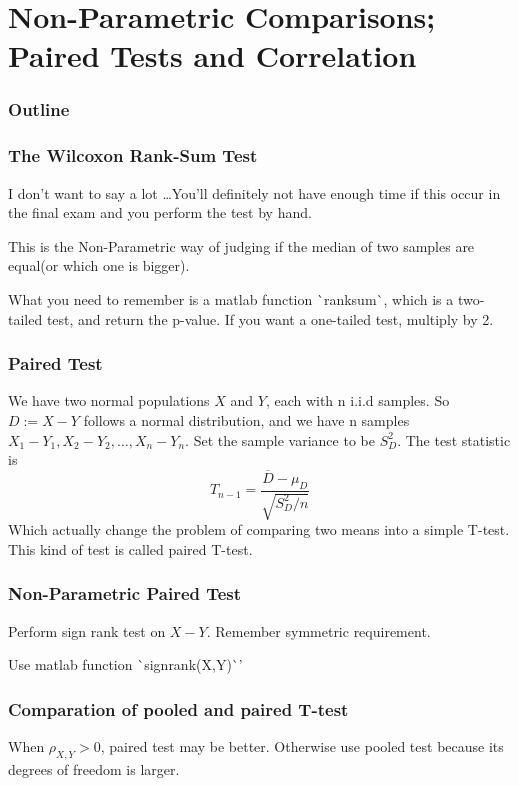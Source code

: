 \documentclass{beamer}
\begin{document}
\section{Non-Parametric Comparisons; Paired Tests and Correlation}
\begin{frame}
    \frametitle{Outline}
    \tableofcontents[currentsection]
\end{frame}

\begin{frame}
    \frametitle{The Wilcoxon Rank-Sum Test}

    I don't want to say a lot \dots You'll definitely not have enough time if this occur in the final exam and you perform the test by hand. \par
    This is the Non-Parametric way of judging if the median of two samples are equal(or which one is bigger). \par
    What you need to remember is a matlab function \`{}ranksum\`{}, which is a two-tailed test, and return the p-value. If you want a one-tailed test, multiply by 2.

\end{frame}

\begin{frame}
    \frametitle{Paired Test}

    We have two normal populations $X$ and $Y$, each with n i.i.d samples. So $D:=X-Y$ follows a normal distribution, and we have n samples $X_1-Y_1, X_2-Y_2, \dots, X_n-Y_n$. Set the sample variance to be $S_{D}^2$. The test statistic is 
    \[T_{n-1}=\frac{\overline{D}-\mu_{D}}{\sqrt{S_{D}^2/n}}\]
    Which actually change the problem of comparing two means into a simple T-test. This kind of test is called paired T-test.
\end{frame}

\begin{frame}
    \frametitle{Non-Parametric Paired Test}

    Perform sign rank test on $X-Y$. Remember symmetric requirement.\par
    Use matlab function \`{}signrank(X,Y)\`{}'

\end{frame}

\begin{frame}
    \frametitle{Comparation of pooled and paired T-test}
    When $\rho_{X,Y}>0$, paired test may be better. Otherwise use pooled test because its degrees of freedom is larger.
    

\end{frame}
\end{document}
